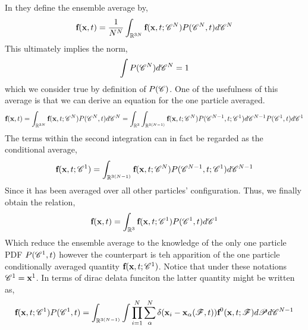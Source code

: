 In \citet{batchelor1972sedimentation} they define the ensemble average by, 
\begin{equation*}
    \textbf{f}(\textbf{x},t)
    = \frac{1}{N^N} 
    \int_{\mathbb{R}^{3N}}
    \textbf{f}(\textbf{x},t;\mathscr{C}^N)
    P(\mathscr{C}^N,t)
    d\mathscr{C}^N
\end{equation*} 
This ultimately implies the norm, 
\begin{equation*}
    \int 
    P(\mathscr{C}^N)
    d\mathscr{C}^N
    = 1
\end{equation*}
which we consider true by definition of $P(\mathscr{C})$. 
One of the usefulness of this average is that we can derive an equation for the one particle averaged. 
\begin{equation*}
    \textbf{f}(\textbf{x},t)
    = \int_{\mathbb{R}^{3N}}
    \textbf{f}(\textbf{x},t;\mathscr{C}^N)
    P(\mathscr{C}^N,t)
    d\mathscr{C}^N
    = 
    \int_{\mathbb{R}^{3}}
    \int_{\mathbb{R}^{3(N-1)}}
    \textbf{f}(\textbf{x},t;\mathscr{C}^N)
    P(\mathscr{C}^{N-1},t;\mathscr{C}^1)
    d\mathscr{C}^{N-1}
    P(\mathscr{C}^1,t)
    d\mathscr{C}^1
\end{equation*} 
The terms within the second integration can in fact be regarded as the conditional average, 
\begin{equation*}
    \textbf{f}(\textbf{x},t;\mathscr{C}^1)
    = 
    \int_{\mathbb{R}^{3(N-1)}}
    \textbf{f}(\textbf{x},t;\mathscr{C}^N)
    P(\mathscr{C}^{N-1},t;\mathscr{C}^1)
    d\mathscr{C}^{N-1}
\end{equation*}
Since it has been averaged over all other particles' configuration. 
Thus, we finally obtain the relation, 
\begin{equation*}
    \textbf{f}(\textbf{x},t)
    =
    \int_{\mathbb{R}^{3}}
    \textbf{f}(\textbf{x},t;\mathscr{C}^1)P(\mathscr{C}^1,t)
    d\mathscr{C}^1
\end{equation*} 
Which reduce the ensemble average to the knowledge of the only one particle PDF 
$P(\mathscr{C}^1,t)$ however the counterpart is teh apparition of the one particle conditionally averaged quantity $\textbf{f}(\textbf{x},t;\mathscr{C}^1)$. 
Notice that under these notations $\mathscr{C}^1 = \textbf{x}^1$. 
In terms of dirac delata funciton the latter quantity might be written as, 
\begin{equation*}
    \textbf{f}(\textbf{x},t;\mathscr{C}^1)P(\mathscr{C}^1,t)
    = \int_{\mathbb{R}^{3(N-1)}}
    \int 
    \prod_{i=1}^{N}\sum_{\alpha}^{N}\delta(\textbf{x}_i - \textbf{x}_\alpha(\mathscr{F},t)) \textbf{f}^0(\textbf{x},t;\mathscr{F})
    d\mathscr{P}
    d\mathscr{C}^{N-1}
    \label{eq:conditional_def}
\end{equation*}

